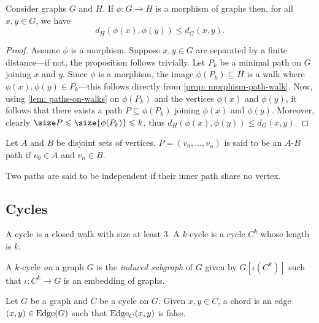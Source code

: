 \begin{corollary}
\label{cor: morphism-cycle}
Consider graphs \(G\) and \(H\). If \(\phi: G \to H\) is a morphism of
graphs then, for all \(x, y \in G\), we have
\[
  d_H(\phi(x), \phi(y)) \leq d_G(x, y).
\]
\end{corollary}

\begin{proof}
Assume \(\phi\) is a morphism. Suppose \(x, y \in G\) are separated by a
finite distance---if not, the proposition follows trivially. Let \(P_k\) be
a minimal path on \(G\) joining \(x\) and \(y\). Since \(\phi\) is a morphism,
the image \(\phi(P_k) \subseteq H\) is a walk where \(\phi(x), \phi(y) \in
P_k\)---this follows directly from \cref{prop: morphism-path-walk}. Now,
using \cref{lem: paths-on-walks} on \(\phi(P_k)\) and the vertices \(\phi(x)\)
and \(\phi(y)\), it follows that there exists a path \(P \subseteq \phi(P_k)\)
joining \(\phi(x)\) and \(\phi(y)\). Moreover, clearly \(\size P \leq
\size{\phi(P_k)} \leq k\), thus \(d_H(\phi(x), \phi(y)) \leq d_G(x, y)\).
\end{proof}

\begin{definition}\label{def: A-B-path}
Let \(A\) and \(B\) be disjoint sets of vertices. \(P = (v_0, \dots, v_n)\) is
said to be an \(A\)-\(B\) path if \(v_0 \in A\) and \(v_n \in B\).
\end{definition}

\begin{definition}\label{def: independent-paths}
Two paths are said to be independent if their inner path share no vertex.
\end{definition}

\subsection{Cycles}

\begin{definition}\label{def: cycle}
A cycle is a closed walk with size at least \(3\). A \(k\)-cycle is a cycle
\(C^k\) whose length is \(k\).

A \(k\)-cycle \emph{on} a graph \(G\) is the \emph{induced subgraph} of \(G\)
given by \(G[\iota(C^k)]\) such that \(\iota: C^k \to G\) is an embedding of
graphs.
\end{definition}

\begin{definition}[Chords]\label{def: chord}
Let \(G\) be a graph and \(C\) be a cycle on \(G\). Given \(x, y \in C\), a
chord is an edge \((x, y) \in \operatorname{Edge}(G)\) such that \(\operatorname{Edge}_C(x, y)\) is false.
\end{definition}

